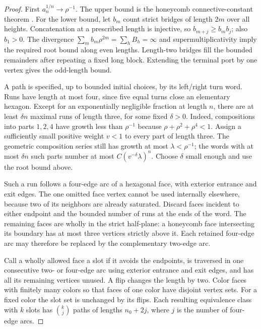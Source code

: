 \begin{proof}
First $a_n^{1/n}\to\rho^{-1}$. The upper bound is the honeycomb connective-constant theorem \cite{DCS2012}. For the lower bound, let $b_m$ count strict bridges of length $2m$ over all heights. Concatenation at a prescribed length is injective, so $b_{m+j}\ge b_mb_j$; also $b_1>0$. The divergence $\sum_m b_m\rho^{2m}=\sum_hB_h=\infty$ and supermultiplicativity imply the required root bound along even lengths. Length-two bridges fill the bounded remainders after repeating a fixed long block. Extending the terminal port by one vertex gives the odd-length bound.

A path is specified, up to bounded initial choices, by its left/right turn word. Runs have length at most four, since five equal turns close an elementary hexagon. Except for an exponentially negligible fraction at length $n$, there are at least $\delta n$ maximal runs of length three, for some fixed $\delta>0$. Indeed, compositions into parts $1,2,4$ have growth less than $\rho^{-1}$ because $\rho+\rho^2+\rho^4<1$. Assign a sufficiently small positive weight $v<1$ to every part of length three. The geometric composition series still has growth at most $\lambda<\rho^{-1}$; the words with at most $\delta n$ such parts number at most $C(v^{-\delta}\lambda)^n$. Choose $\delta$ small enough and use the root bound above.

Such a run follows a four-edge arc of a hexagonal face, with exterior entrance and exit edges. The one omitted face vertex cannot be used internally elsewhere, because two of its neighbors are already saturated. Discard faces incident to either endpoint and the bounded number of runs at the ends of the word. The remaining faces are wholly in the strict half-plane: a honeycomb face intersecting its boundary has at most three vertices strictly above it. Each retained four-edge arc may therefore be replaced by the complementary two-edge arc.

Call a wholly allowed face a slot if it avoids the endpoints, is traversed in one consecutive two- or four-edge arc using exterior entrance and exit edges, and has all its remaining vertices unused. A flip changes the length by two. Color faces with finitely many colors so that faces of one color have disjoint vertex sets. For a fixed color the slot set is unchanged by its flips. Each resulting equivalence class with $k$ slots has $\binom{k}{j}$ paths of lengths $n_0+2j$, where $j$ is the number of four-edge arcs.


\end{proof}
